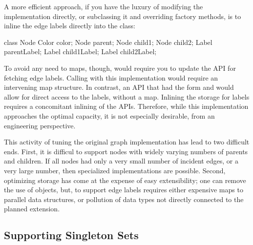A more efficient approach, if you have the luxury of modifying the 
implementation directly, or subclassing it and overriding factory methods, is to
inline the edge labels directly into the  class:
\begin{shortlisting}
class Node {
   Color color;
   Node parent;
   Node child1;
   Node child2;
   Label parentLabel;
   Label child1Label;
   Label child2Label;
}
\end{shortlisting} 
To avoid any need to maps, though, would require you to update the API for
fetching edge labels. Calling  with
this implementation would require an intervening map structure. In contrast,
an API that had the form  and
 would allow for direct access to the labels,
without a map. Inlining the storage for labels requires a concomitant inlining
of the APIs. Therefore, while this implementation
approaches the optimal capacity, it is not especially desirable, from an
engineering perspective.
 
This activity of tuning the original graph implementation has lead to two
difficult ends. First, it is difficul to support nodes with widely
varying numbers of parents and children. If all nodes had only a very small number of incident
edges, or a very large number, then specialized implementations are possible.
Second, optimizing storage has come at the expense of easy extensibility; one
can remove the use of  objects, but, to support edge labels 
requires either expensive maps to parallel data structures, or 
pollution of data types not directly connected to the planned extension.

\subsection{Supporting Singleton Sets}


